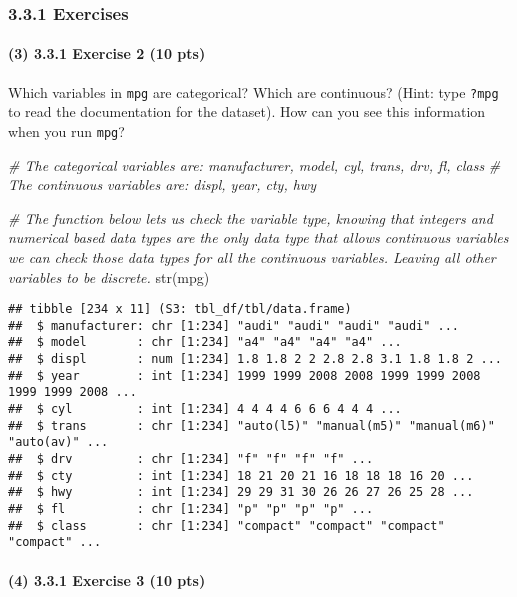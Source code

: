 \documentclass[
]{article}
\newenvironment{Shaded}{\begin{snugshade}}{\end{snugshade}}
\newcommand{\CommentTok}[1]{\textcolor[rgb]{0.56,0.35,0.01}{\textit{#1}}}
\newcommand{\FunctionTok}[1]{\textcolor[rgb]{0.00,0.00,0.00}{#1}}
\newcommand{\NormalTok}[1]{#1}
\begin{document}
\hypertarget{exercises-1}{%
\subsubsection{3.3.1 Exercises}\label{exercises-1}}

\hypertarget{exercise-2-10-pts}{%
\paragraph{(3) 3.3.1 Exercise 2 (10 pts)}\label{exercise-2-10-pts}}

Which variables in \texttt{mpg} are categorical? Which are continuous?
(Hint: type \texttt{?mpg} to read the documentation for the dataset).
How can you see this information when you run \texttt{mpg}?

\begin{Shaded}
\begin{Highlighting}[]
\CommentTok{\# The categorical variables are: manufacturer, model, cyl, trans, drv, fl, class}
\CommentTok{\# The continuous variables are: displ, year, cty, hwy}

\CommentTok{\# The function below lets us check the variable type, knowing that integers and numerical based data types are the only data type that allows continuous variables we can check those data types for all the continuous variables. Leaving all other variables to be discrete.}
\FunctionTok{str}\NormalTok{(mpg)}
\end{Highlighting}
\end{Shaded}

\begin{verbatim}
## tibble [234 x 11] (S3: tbl_df/tbl/data.frame)
##  $ manufacturer: chr [1:234] "audi" "audi" "audi" "audi" ...
##  $ model       : chr [1:234] "a4" "a4" "a4" "a4" ...
##  $ displ       : num [1:234] 1.8 1.8 2 2 2.8 2.8 3.1 1.8 1.8 2 ...
##  $ year        : int [1:234] 1999 1999 2008 2008 1999 1999 2008 1999 1999 2008 ...
##  $ cyl         : int [1:234] 4 4 4 4 6 6 6 4 4 4 ...
##  $ trans       : chr [1:234] "auto(l5)" "manual(m5)" "manual(m6)" "auto(av)" ...
##  $ drv         : chr [1:234] "f" "f" "f" "f" ...
##  $ cty         : int [1:234] 18 21 20 21 16 18 18 18 16 20 ...
##  $ hwy         : int [1:234] 29 29 31 30 26 26 27 26 25 28 ...
##  $ fl          : chr [1:234] "p" "p" "p" "p" ...
##  $ class       : chr [1:234] "compact" "compact" "compact" "compact" ...
\end{verbatim}

\hypertarget{exercise-3-10-pts}{%
\paragraph{(4) 3.3.1 Exercise 3 (10 pts)}\label{exercise-3-10-pts}}
\end{document}
